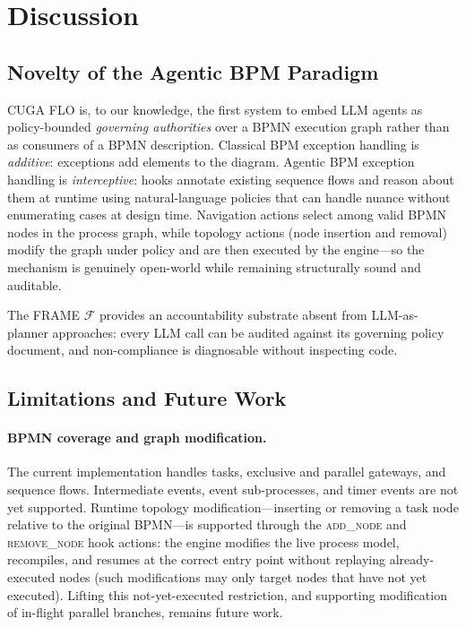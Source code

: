 \documentclass[11pt,a4paper]{article}
\begin{document}
\section{Discussion}
\label{sec:discussion}

\subsection{Novelty of the Agentic BPM Paradigm}

CUGA FLO is, to our knowledge, the first system to embed LLM agents as
policy-bounded \emph{governing authorities} over a BPMN execution graph rather than
as consumers of a BPMN description. Classical BPM exception handling is
\emph{additive}: exceptions add elements to the diagram. Agentic BPM exception
handling is \emph{interceptive}: hooks annotate existing sequence flows and reason
about them at runtime using natural-language policies that can handle nuance without
enumerating cases at design time. Navigation actions select among valid BPMN nodes
in the process graph, while topology actions (node insertion and removal) modify the
graph under policy and are then executed by the engine---so the mechanism is
genuinely open-world while remaining structurally sound and auditable.

The FRAME $\mathcal{F}$ provides an accountability substrate absent from
LLM-as-planner approaches: every LLM call can be audited against its governing
policy document, and non-compliance is diagnosable without inspecting code.

\subsection{Limitations and Future Work}

\paragraph{BPMN coverage and graph modification.}
The current implementation handles tasks, exclusive and parallel gateways, and
sequence flows. Intermediate events, event sub-processes, and timer events are not
yet supported. Runtime topology modification---inserting or removing a task node
relative to the original BPMN---is supported through the \textsc{add\_node} and
\textsc{remove\_node} hook actions: the engine modifies the live process model,
recompiles, and resumes at the correct entry point without replaying already-executed
nodes (such modifications may only target nodes that have not yet executed). Lifting
this not-yet-executed restriction, and supporting modification of in-flight parallel
branches, remains future work.
\end{document}
